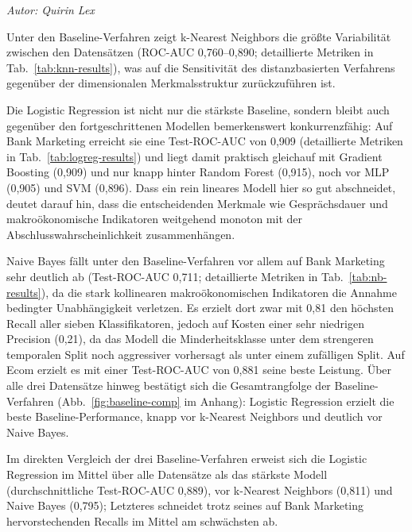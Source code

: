 \documentclass[10pt]{scrartcl}
\begin{document}
\begin{flushright}\textit{Autor: Quirin Lex}\end{flushright}

Unter den Baseline-Verfahren zeigt k-Nearest Neighbors die größte Variabilität zwischen den Datensätzen (ROC-AUC 0{,}760--0{,}890; detaillierte Metriken in Tab.~\ref{tab:knn-results}), was auf die Sensitivität des distanzbasierten Verfahrens gegenüber der dimensionalen Merkmalsstruktur zurückzuführen ist.

Die Logistic Regression ist nicht nur die stärkste Baseline, sondern bleibt auch gegenüber den fortgeschrittenen Modellen bemerkenswert konkurrenzfähig: Auf Bank Marketing erreicht sie eine Test-ROC-AUC von 0{,}909 (detaillierte Metriken in Tab.~\ref{tab:logreg-results}) und liegt damit praktisch gleichauf mit Gradient Boosting (0{,}909) und nur knapp hinter Random Forest (0{,}915), noch vor MLP (0{,}905) und SVM (0{,}896). Dass ein rein lineares Modell hier so gut abschneidet, deutet darauf hin, dass die entscheidenden Merkmale wie Gesprächsdauer und makroökonomische Indikatoren weitgehend monoton mit der Abschlusswahrscheinlichkeit zusammenhängen.

Naive Bayes fällt unter den Baseline-Verfahren vor allem auf Bank Marketing sehr deutlich ab (Test-ROC-AUC 0{,}711; detaillierte Metriken in Tab.~\ref{tab:nb-results}), da die stark kollinearen makroökonomischen Indikatoren die Annahme bedingter Unabhängigkeit verletzen. Es erzielt dort zwar mit 0{,}81 den höchsten Recall aller sieben Klassifikatoren, jedoch auf Kosten einer sehr niedrigen Precision (0{,}21), da das Modell die Minderheitsklasse unter dem strengeren temporalen Split noch aggressiver vorhersagt als unter einem zufälligen Split. Auf Ecom erzielt es mit einer Test-ROC-AUC von 0{,}881 seine beste Leistung. Über alle drei Datensätze hinweg bestätigt sich die Gesamtrangfolge der Baseline-Verfahren (Abb.~\ref{fig:baseline-comp} im Anhang): Logistic Regression erzielt die beste Baseline-Performance, knapp vor k-Nearest Neighbors und deutlich vor Naive Bayes.

Im direkten Vergleich der drei Baseline-Verfahren erweist sich die Logistic Regression im Mittel über alle Datensätze als das stärkste Modell (durchschnittliche Test-ROC-AUC 0{,}889), vor k-Nearest Neighbors (0{,}811) und Naive Bayes (0{,}795); Letzteres schneidet trotz seines auf Bank Marketing hervorstechenden Recalls im Mittel am schwächsten ab.
\end{document}
